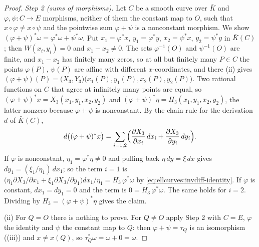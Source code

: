 \begin{proof}
\emph{Step 2 (sums of morphisms).} Let $C$ be a smooth curve over $\bar K$ and $\varphi,\psi\colon C\to E$ morphisms, neither of them the constant map to $O$, such that
$x\circ\varphi\ne x\circ\psi$ and the pointwise sum $\varphi+\psi$ is a nonconstant morphism. We show $(\varphi+\psi)^*\omega=\varphi^*\omega+\psi^*\omega$. Put
$x_1=\varphi^*x$, $y_1=\varphi^*y$, $x_2=\psi^*x$, $y_2=\psi^*y$ in $\bar K(C)$; then $W(x_i,y_i)=0$ and $x_1-x_2\ne0$. The sets $\varphi^{-1}(O)$ and $\psi^{-1}(O)$
are finite, and $x_1-x_2$ has finitely many zeros, so at all but finitely many $P\in C$ the points $\varphi(P)$, $\psi(P)$ are affine with different $x$-coordinates,
and there (ii) gives $(\varphi+\psi)(P)=\bigl(X_3,Y_3\bigr)\bigl(x_1(P),y_1(P),x_2(P),y_2(P)\bigr)$. Two rational functions on $C$ that agree at
infinitely many points are equal, so $(\varphi+\psi)^*x=X_3(x_1,y_1,x_2,y_2)$ and $(\varphi+\psi)^*\eta=H_3(x_1,y_1,x_2,y_2)$, the latter nonzero because $\varphi+\psi$
is nonconstant. By the chain rule for the derivation $d$ of $\bar K(C)$,
\[
d\bigl((\varphi+\psi)^*x\bigr)=\sum_{i=1,2}\Bigl(\frac{\partial X_3}{\partial x_i}\,dx_i+\frac{\partial X_3}{\partial y_i}\,dy_i\Bigr).
\]
If $\varphi$ is nonconstant, $\eta_1=\varphi^*\eta\ne0$ and pulling back $\eta\,dy=\xi\,dx$ gives $dy_1=(\xi_1/\eta_1)\,dx_1$; so the term $i=1$ is
$\bigl(\eta_1\partial X_3/\partial x_1+\xi_1\partial X_3/\partial y_1\bigr)dx_1/\eta_1=H_3\,\varphi^*\omega$ by \eqref{eq:ellcurves:invdiff-identity}. If $\varphi$ is constant,
$dx_1=dy_1=0$ and the term is $0=H_3\,\varphi^*\omega$. The same holds for $i=2$. Dividing by $H_3=(\varphi+\psi)^*\eta$ gives the claim.

(ii) For $Q=O$ there is nothing to prove. For $Q\ne O$ apply Step 2 with $C=E$, $\varphi$ the identity and $\psi$ the constant map to $Q$: then $\varphi+\psi=\tau_Q$ is an
isomorphism ((iii)) and $x\ne x(Q)$, so $\tau_Q^*\omega=\omega+0=\omega$.


\end{proof}

